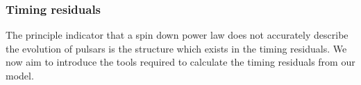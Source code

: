 \documentclass[/home/greg/Thesis/main/main.tex]{subfiles}
\begin{document}
\FloatBarrier
%

%

\subsubsection{Timing residuals}

The principle indicator that a spin down power law does not accurately describe
the evolution of pulsars is the structure which exists in the timing
residuals. We now aim to introduce the tools required to calculate the timing
residuals from our model.
\end{document}
